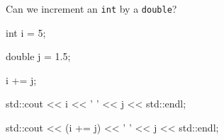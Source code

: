 Can we increment an \texttt{int} by a \texttt{double}?

\begin{console}

int i = 5;

double j = 1.5;

i += j;

std::cout << i << ' ' << j << std::endl;

std::cout << (i += j) << ' ' << j << std::endl;

\end{console}

